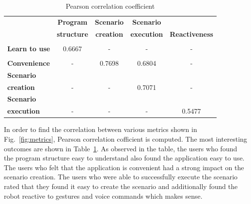 \begin{table}[h]
\caption{Pearson correlation coefficient}
\label{table:correlation}
\begin{center}
\begin{tabular}{|l|c|c|c|c|}
\hline
  {} & \textbf{Program}& \textbf{Scenario}& \textbf{Scenario}& \textbf{}\\
    {} & \textbf{structure}& \textbf{creation}& \textbf{execution}& \textbf{Reactiveness}\\
\hline
{} & {} & {} & {} & {}\\
\textbf{Learn to use} & {0.6667} & {-} & {-} & {-}\\
\hline
{} & {} & {} & {} & {}\\
\textbf{Convenience} & {-} & {0.7698} & {0.6804} & {-}\\
\hline
\textbf{Scenario}  & {} & {} & {} & {}\\
\textbf{creation}  & {-} & {-} & {0.7071} & {-}\\
\hline
\textbf{Scenario} & {} & {} & {} & {}\\
\textbf{execution} & {-} & {-} & {-} & {0.5477}\\
\hline
\end{tabular}
\end{center}
\end{table}
In order to find the correlation between various metrics shown in Fig.~\ref{fig:metrics}, Pearson correlation cofficient is computed. The most interesting outcomes are shown in Table~\ref{table:correlation}. As observed in the table, the users who found the program structure easy to understand also found the application easy to use. The users who felt that the application is convenient had a strong impact on the scenario creation. The users who were able to successfully execute the scenario rated that they found it easy to create the scenario and additionally found the robot reactive to gestures and voice commands which makes sense. 
 
